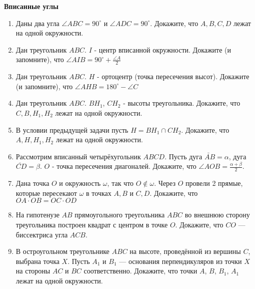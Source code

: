 \documentclass{article}
\begin{document}
\large


\begin{center}
\textbf{Вписанные углы}
\end{center}



\begin{enumerate}[label*=\protect\fbox{\arabic{enumi}}]

\item Даны два угла $\angle ABC = 90^\circ$ и $\angle ADC = 90^\circ$. Докажите, что $A, B, C, D$ лежат на одной окружности.

\item Дан треугольник $ABC$. $I$ - центр вписанной окружности. Докажите (и запомните), что $\angle AIB = 90^\circ + \frac{\angle A}{2}$

\item Дан треугольник $ABC$. $H$ - ортоцентр (точка пересечения высот). Докажите (и запомните), что $\angle AHB = 180^\circ - \angle C$

\item Дан треугольник $ABC$. $BH_1$, $CH_2$ - высоты треугольника. Докажите, что $C,B,H_1, H_2$ лежат на одной окружности.

\item В условии предыдущей задачи пусть $H = BH_1 \cap CH_2$. Докажите, что $A,H,H_1, H_2$ лежат на одной окружности.

\item Рассмотрим вписанный четырёхугольник $ABCD$. Пусть дуга $\breve{AB} = \alpha$, дуга $\breve{CD} = \beta$. $O$ - точка пересечения диагоналей. Докажите, что $\angle AOB = \frac{\alpha +  \beta}{2}$.

\item Дана точка $O$ и окружность $\omega$, так что $O \notin \omega$. Через $O$ провели 2 прямые, которые пересекают $\omega$ в точках $A, B$ и $C, D$. Докажите, что $OA\cdot OB = OC\cdot OD$

\item На гипотенузе $AB$ прямоугольного треугольника $ABC$ во внешнюю сторону треугольника построен квадрат с центром в точке $O$. Докажите, что $CO$ — биссектриса угла $ACB$.

\item В остроугольном треугольнике $ABC$ на высоте, проведённой из вершины $C$, выбрана точка $X$. Пусть $A_1$ и $B_1$ — основания перпендикуляров из точки $X$ на стороны $AC$ и $BC$ соответственно. Докажите, что точки $A$, $B$, $B_1$, $A_1$ лежат на одной окружности.


\end{enumerate}
\end{document}
